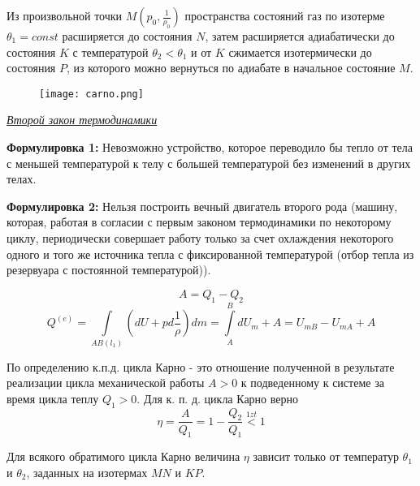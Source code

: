 Из произвольной точки $M (p_0, \frac{1}{\rho_0})$ пространства состояний газ по изотерме $\theta_1 = const$ расширяется до состояния $N$, затем расширяется адиабатически до состояния $K$ с температурой $\theta_2 < \theta_1$ и от $K$ сжимается изотермически до состояния $P$, из которого можно вернуться по адиабате в начальное состояние $M$.

\begin{figure}[H]
\texttt{[image: carno.png]}
\end{figure}


\begin{center}
	\textit{\underline{Второй закон термодинамики}}
\end{center}

\textbf{Формулировка 1:} Невозможно устройство, которое переводило бы тепло от тела с меньшей температурой к телу с большей температурой без изменений в других телах.

\textbf{Формулировка 2:} Нельзя построить вечный двигатель второго рода (машину,  которая,  работая в согласии с первым законом термодинамики по некоторому циклу,  периодически совершает работу только за счет охлаждения некоторого одного и того же источника тепла с фиксированной температурой (отбор тепла из резервуара с постоянной температурой)).

$$ A = Q_1 - Q_2 $$
$$ Q^{(e)} = \int\limits_{AB(l_1)}\left( dU + pd\frac{1}{\rho} \right) dm = \int\limits_{A}^{B}dU_m + A = U_{mB} - U_{mA} + A $$

По определению к.п.д.  цикла Карно - это отношение полученной в результате реализации цикла механической работы $A > 0$ к подведенному к системе за время цикла теплу $Q_1 > 0$.  Для к. п. д. цикла Карно верно
$$ \eta = \frac{A}{Q_1} = 1 - \frac{Q_2}{Q_1} \overset{1zt}{<} 1 $$

\begin{statement}
	Для всякого обратимого цикла Карно величина $\eta$ зависит только от температур $\theta_1$ и $\theta_2$,  заданных на изотермах $MN$ и $KP$.
\end{statement}

